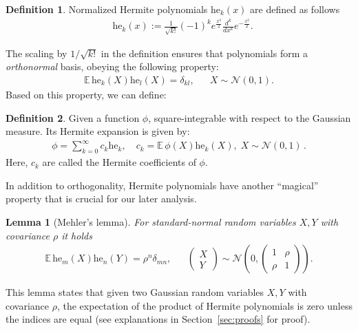 \documentclass[twoside]{article}
\newcommand{\E}{\mathbb{E}\,}
\newcommand{\he}{\mathrm{he}}
\newtheorem{lemma}{Lemma}
\theoremstyle{definition}
\newtheorem{definition}{Definition}
\begin{document}
\begin{definition}
Normalized Hermite polynomials $\he_k(x)$ are defined as follows
\begin{align*}
&\he_k(x) :=\frac{1}{\sqrt{k!}}(-1)^k e^{\frac{x^2}{2}} \frac{d^k}{dx^k} e^{-\frac{x^2}{2}}.
\end{align*}
\end{definition}

The scaling by $1/\sqrt{k!}$ in the definition ensures that polynomials form a \emph{orthonormal} basis, obeying the following property:
\begin{align}\label{eq:hermite_orthogonality}
\E\he_k(X)\he_l(X) = \delta_{kl}, && X \sim \mathcal N(0,1).
\end{align}
Based on this property, we can define:
\begin{definition}\label{def:hermite_expansion}
Given a function $\phi$, square-integrable with respect to the Gaussian measure. Its Hermite expansion is given by:
\begin{align*}
\phi = \sum_{k=0}^\infty c_k \he_k,\quad c_k = \E\phi(X) \he_k(X), \; X \sim \mathcal N (0,1)\,.
\end{align*}
Here, $c_k$ are called the Hermite coefficients of $\phi$. 
\end{definition}


In addition to orthogonality, Hermite polynomials have another ``magical'' property that is crucial for our later analysis. 

\begin{lemma}[Mehler's lemma]\label{lem:mehler_kernel}
For standard-normal random variables $X,Y$ with covariance $\rho$ it holds
\begin{align*}
\E\he_m(X)\he_n(Y) = \rho^n \delta_{mn}, && \begin{pmatrix}
    X \\ Y
\end{pmatrix}\sim \mathcal N\left(0, \begin{pmatrix} 1 & \rho \\ \rho & 1 \end{pmatrix}
 \right).
\end{align*}
\end{lemma}

This lemma states that given two Gaussian random variables $X, Y$ with covariance $\rho$, the expectation of the product of Hermite polynomials is zero unless the indices are equal (see explanations in Section~\ref{sec:proofs} for proof).
\end{document}

